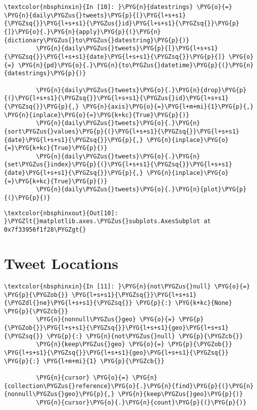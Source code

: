 \documentclass[letterpaper,10pt,english]{sphinxmanual}
\begin{document}
%
\begin{Verbatim}[commandchars=\\\{\}]
\textcolor{nbsphinxin}{In [10]: }\PYG{n}{datestrings} \PYG{o}{=} \PYG{n}{daily\PYGZus{}tweets}\PYG{p}{[}\PYG{l+s+s1}{\PYGZsq{}}\PYG{l+s+s1}{\PYGZus{}id}\PYG{l+s+s1}{\PYGZsq{}}\PYG{p}{]}\PYG{o}{.}\PYG{n}{apply}\PYG{p}{(}\PYG{n}{dictionary\PYGZus{}to\PYGZus{}datestring}\PYG{p}{)}
         \PYG{n}{daily\PYGZus{}tweets}\PYG{p}{[}\PYG{l+s+s1}{\PYGZsq{}}\PYG{l+s+s1}{date}\PYG{l+s+s1}{\PYGZsq{}}\PYG{p}{]} \PYG{o}{=} \PYG{n}{pd}\PYG{o}{.}\PYG{n}{to\PYGZus{}datetime}\PYG{p}{(}\PYG{n}{datestrings}\PYG{p}{)}
         
         \PYG{n}{daily\PYGZus{}tweets}\PYG{o}{.}\PYG{n}{drop}\PYG{p}{(}\PYG{l+s+s1}{\PYGZsq{}}\PYG{l+s+s1}{\PYGZus{}id}\PYG{l+s+s1}{\PYGZsq{}}\PYG{p}{,} \PYG{n}{axis}\PYG{o}{=}\PYG{l+m+mi}{1}\PYG{p}{,} \PYG{n}{inplace}\PYG{o}{=}\PYG{k+kc}{True}\PYG{p}{)}
         \PYG{n}{daily\PYGZus{}tweets}\PYG{o}{.}\PYG{n}{sort\PYGZus{}values}\PYG{p}{(}\PYG{l+s+s1}{\PYGZsq{}}\PYG{l+s+s1}{date}\PYG{l+s+s1}{\PYGZsq{}}\PYG{p}{,} \PYG{n}{inplace}\PYG{o}{=}\PYG{k+kc}{True}\PYG{p}{)}
         \PYG{n}{daily\PYGZus{}tweets}\PYG{o}{.}\PYG{n}{set\PYGZus{}index}\PYG{p}{(}\PYG{l+s+s1}{\PYGZsq{}}\PYG{l+s+s1}{date}\PYG{l+s+s1}{\PYGZsq{}}\PYG{p}{,} \PYG{n}{inplace}\PYG{o}{=}\PYG{k+kc}{True}\PYG{p}{)}
         \PYG{n}{daily\PYGZus{}tweets}\PYG{o}{.}\PYG{n}{plot}\PYG{p}{(}\PYG{p}{)}
\end{Verbatim}

%
\begin{Verbatim}[commandchars=\\\{\}]
\textcolor{nbsphinxout}{Out[10]: }\PYGZlt{}matplotlib.axes.\PYGZus{}subplots.AxesSubplot at 0x7f33956f1f28\PYGZgt{}
\end{Verbatim}

\noindent{}


\section{Tweet Locations}
\label{\detokenize{04-mongo/04-04-time-and-space:Tweet-Locations}}
%
\begin{Verbatim}[commandchars=\\\{\}]
\textcolor{nbsphinxin}{In [11]: }\PYG{n}{not\PYGZus{}null} \PYG{o}{=} \PYG{p}{\PYGZob{}} \PYG{l+s+s1}{\PYGZsq{}}\PYG{l+s+s1}{\PYGZdl{}ne}\PYG{l+s+s1}{\PYGZsq{}} \PYG{p}{:} \PYG{k+kc}{None} \PYG{p}{\PYGZcb{}}
         \PYG{n}{nonnull\PYGZus{}geo} \PYG{o}{=} \PYG{p}{\PYGZob{}}\PYG{l+s+s1}{\PYGZsq{}}\PYG{l+s+s1}{geo}\PYG{l+s+s1}{\PYGZsq{}} \PYG{p}{:} \PYG{n}{not\PYGZus{}null} \PYG{p}{\PYGZcb{}}
         \PYG{n}{keep\PYGZus{}geo} \PYG{o}{=} \PYG{p}{\PYGZob{}} \PYG{l+s+s1}{\PYGZsq{}}\PYG{l+s+s1}{geo}\PYG{l+s+s1}{\PYGZsq{}} \PYG{p}{:} \PYG{l+m+mi}{1} \PYG{p}{\PYGZcb{}}
         
         \PYG{n}{cursor} \PYG{o}{=} \PYG{n}{collection\PYGZus{}reference}\PYG{o}{.}\PYG{n}{find}\PYG{p}{(}\PYG{n}{nonnull\PYGZus{}geo}\PYG{p}{,} \PYG{n}{keep\PYGZus{}geo}\PYG{p}{)}
         \PYG{n}{cursor}\PYG{o}{.}\PYG{n}{count}\PYG{p}{(}\PYG{p}{)}
\end{Verbatim}
\end{document}
